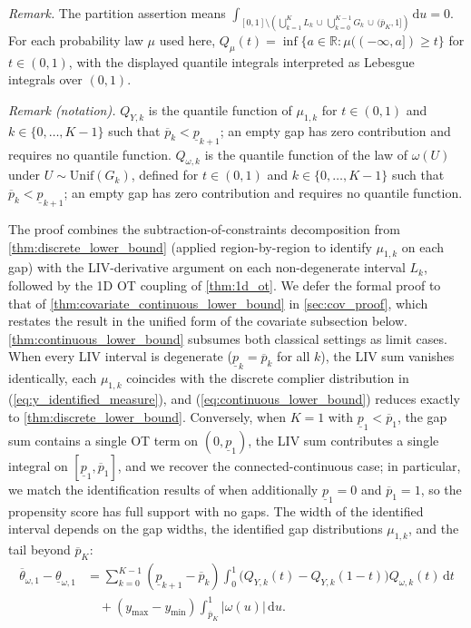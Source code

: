 \noindent\textit{Remark.} The partition assertion means $\int_{[0,1]\setminus\left(\bigcup_{k=1}^{K}L_k\,\cup\,\bigcup_{k=0}^{K-1}G_k\,\cup\,(\overline p_K,1]\right)}\mathrm du=0$. For each probability law $\mu$ used here, $Q_\mu(t)=\inf\{a\in\mathbb R:\mu(( -\infty,a])\geqslant t\}$ for $t\in(0,1)$, with the displayed quantile integrals interpreted as Lebesgue integrals over $(0,1)$.

\noindent\textit{Remark (notation).} $Q_{Y,k}$ is the quantile function of $\mu_{1,k}$ for $t\in(0,1)$ and $k\in\{0,\ldots,K-1\}$ such that $\overline p_k<\underline p_{k+1}$; an empty gap has zero contribution and requires no quantile function. $Q_{\omega,k}$ is the quantile function of the law of $\omega(U)$ under $U\sim\mathrm{Unif}(G_k)$, defined for $t\in(0,1)$ and $k\in\{0,\ldots,K-1\}$ such that $\overline p_k<\underline p_{k+1}$; an empty gap has zero contribution and requires no quantile function.


The proof combines the subtraction-of-constraints decomposition from \cref{thm:discrete_lower_bound} (applied region-by-region to identify $\mu_{1,k}$ on each gap) with the LIV-derivative argument on each non-degenerate interval $L_k$, followed by the 1D OT coupling of \cref{thm:1d_ot}. We defer the formal proof to that of \cref{thm:covariate_continuous_lower_bound} in \cref{sec:cov_proof}, which restates the result in the unified form of the covariate subsection below. \cref{thm:continuous_lower_bound} subsumes both classical settings as limit cases. When every LIV interval is degenerate ($\underline{p}_k = \overline{p}_k$ for all $k$), the LIV sum vanishes identically, each $\mu_{1,k}$ coincides with the discrete complier distribution in (\ref{eq:y_identified_measure}), and (\ref{eq:continuous_lower_bound}) reduces exactly to \cref{thm:discrete_lower_bound}. Conversely, when $K=1$ with $\underline{p}_1 < \overline{p}_1$, the gap sum contains a single OT term on $(0,\underline{p}_1)$, the LIV sum contributes a single integral on $[\underline{p}_1,\overline{p}_1]$, and we recover the connected-continuous case; in particular, we match the identification results of \citet{heckman1999local} when additionally $\underline{p}_1 = 0$ and $\overline{p}_1 = 1$, so the propensity score has full support with no gaps. The width of the identified interval depends on the gap widths, the identified gap distributions $\mu_{1,k}$, and the tail beyond $\overline{p}_K$:
\begin{align*}
    \overline{\theta}_{\omega,1} - \underline{\theta}_{\omega,1}
    &= \sum_{k=0}^{K-1}(\underline{p}_{k+1}-\overline{p}_k)\int_0^1\Big(Q_{Y,k}(t) - Q_{Y,k}(1-t)\Big)Q_{\omega,k}(t)\,\mathrm{d}t \\
    &\quad + (y_{\max}-y_{\min})\int_{\overline{p}_K}^{1}|\omega(u)|\,\mathrm{d}u.
\end{align*}



